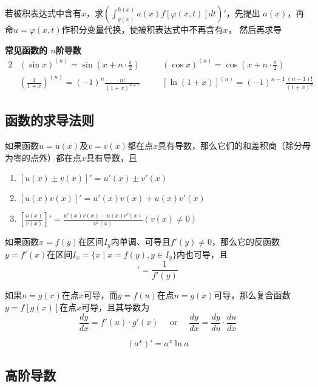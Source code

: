 \documentclass[11pt]{article}
\begin{document}
若被积表达式中含有\(x\)，求\((\int_{g(x)}^{h(x)}a(x)f[\varphi(x,t)]dt)'\)，先提出
\(a(x)\)，再命\(u=\varphi(x,t)\)作积分变量代换，使被积表达式中不再含有\(x\)，
然后再求导


\textbf{常见函数的 \(n\)阶导数}
\begin{alignat*}{2}
&(\sin x)^{(n)} = \sin(x+n\cdot\frac{\pi}{2})&&
(\cos x)^{(n)} = \cos(x+n\cdot\frac{\pi}{2})\\
&(\frac{1}{1+x})^{(n)} = (-1)^n\frac{n!}{(1+x)^{n+1}}\quad&&
[\ln(1+x)]^{(n)}=(-1)^{n-1}\frac{(n-1)!}{(1+x)^n}
\end{alignat*}
\subsection{函数的求导法则}
\label{sec:org4a7ef81}
\begin{theorem}[]
如果函数\(u=u(x)\)及\(v=v(x)\)都在点\(x\)具有导数，那么它们的和差积商（除分母
为零的点外）都在点\(x\)具有导数，且
\begin{enumerate}
\item \([u(x)\pm v(x)]'=u'(x)\pm v'(x)\)
\item \([u(x)v(x)]'=u'(x)v(x)+u(x)v'(x)\)
\item \([\frac{u(x)}{v(x)}]'=\frac{u'(x)v(x)-u(x)v'(x)}{v^2(x)}(v(x)\neq0)\)
\end{enumerate}
\end{theorem}

\begin{theorem}[]
如果函数\(x=f(y)\)在区间\(I_y\)内单调、可导且\(f'(y)\neq0\)，那么它的反函数
\(y=f'(x)\)在区间\(I_x=\{x\mid x=f(y),y\in I_y\}\)内也可导，且
\begin{equation*}
[f^{-1}(x)]'=\frac{1}{f'(y)}
\end{equation*}
\end{theorem}

\begin{theorem}[]
如果\(u=g(x)\)在点\(x\)可导，而\(y=f(u)\)在点\(u=g(x)\)可导，那么复合函数
\(y=f[g(x)]\)在点\(x\)可导，且其导数为
\begin{equation*}
\frac{dy}{dx}=f'(u)\cdot g'(x) \quad\text{ or }\quad
\frac{dy}{dx}=\frac{dy}{du}\cdot\frac{du}{dx}
\end{equation*}
\end{theorem}

\begin{equation*}
(a^x)'=a^x\ln a
\end{equation*}
\subsection{高阶导数}
\label{sec:orgb3c54cf}
\end{document}
